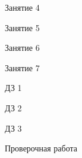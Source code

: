 \begin{class}[number=4]
	\begin{listofex}
		\item Занятие 4
	\end{listofex}
\end{class}

\begin{class}[number=5]
	\begin{listofex}
		\item Занятие 5
	\end{listofex}
\end{class}

\begin{class}[number=6]
	\begin{listofex}
		\item Занятие 6
	\end{listofex}
\end{class}

\begin{class}[number=7]
	\begin{listofex}
		\item Занятие 7
	\end{listofex}
\end{class}

\begin{homework}[number=1]
	\begin{listofex}
		\item ДЗ 1
	\end{listofex}
\end{homework}

\begin{homework}[number=2]
	\begin{listofex}
		\item ДЗ 2
	\end{listofex}
\end{homework}

\begin{homework}[number=3]
	\begin{listofex}
		\item ДЗ 3
	\end{listofex}
\end{homework}

\begin{exam}
	\begin{listofex}
		\item Проверочная работа
	\end{listofex}
\end{exam}
